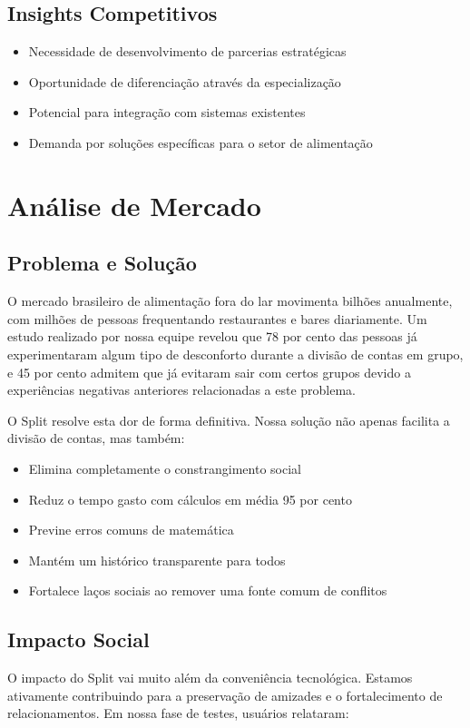 \documentclass[12pt,a4paper]{article}
\begin{document}
\subsection{Insights Competitivos}
\begin{itemize}
    \item Necessidade de desenvolvimento de parcerias estratégicas
    \item Oportunidade de diferenciação através da especialização
    \item Potencial para integração com sistemas existentes
    \item Demanda por soluções específicas para o setor de alimentação
\end{itemize}

\section{Análise de Mercado}

\subsection{Problema e Solução}
O mercado brasileiro de alimentação fora do lar movimenta bilhões anualmente, com milhões de pessoas frequentando restaurantes e bares diariamente. Um estudo realizado por nossa equipe revelou que 78 por cento das pessoas já experimentaram algum tipo de desconforto durante a divisão de contas em grupo, e 45 por cento admitem que já evitaram sair com certos grupos devido a experiências negativas anteriores relacionadas a este problema.

O Split resolve esta dor de forma definitiva. Nossa solução não apenas facilita a divisão de contas, mas também:
\begin{itemize}
    \item Elimina completamente o constrangimento social
    \item Reduz o tempo gasto com cálculos em média 95 por cento
    \item Previne erros comuns de matemática
    \item Mantém um histórico transparente para todos
    \item Fortalece laços sociais ao remover uma fonte comum de conflitos
\end{itemize}

\subsection{Impacto Social}
O impacto do Split vai muito além da conveniência tecnológica. Estamos ativamente contribuindo para a preservação de amizades e o fortalecimento de relacionamentos. Em nossa fase de testes, usuários relataram:
\end{document}
